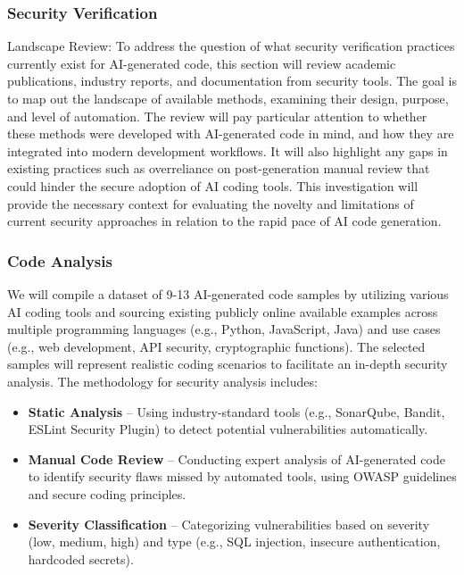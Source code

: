\subsubsection{Security Verification}
Landscape Review: To address the question of what security verification practices currently exist for AI-generated code, this section will review academic publications, industry reports, and documentation from security tools. The goal is to map out the landscape of available methods, examining their design, purpose, and level of automation. The review will pay particular attention to whether these methods were developed with AI-generated code in mind, and how they are integrated into modern development workflows. It will also highlight any gaps in existing practices such as overreliance on post-generation manual review that could hinder the secure adoption of AI coding tools. This investigation will provide the necessary context for evaluating the novelty and limitations of current security approaches in relation to the rapid pace of AI code generation.

\subsubsection{Code Analysis}

We will compile a dataset of 9-13 AI-generated code samples by utilizing various AI coding tools and sourcing existing publicly online available examples across multiple programming languages (e.g., Python, JavaScript, Java) and use cases (e.g., web development, API security, cryptographic functions). The selected samples will represent realistic coding scenarios to facilitate an in-depth security analysis.
The methodology for security analysis includes:

\begin{itemize}
    \item \textbf{Static Analysis} – Using industry-standard tools (e.g., SonarQube, Bandit, ESLint Security Plugin) to detect potential vulnerabilities automatically.
    \item \textbf{Manual Code Review} – Conducting expert analysis of AI-generated code to identify security flaws missed by automated tools, using OWASP guidelines and secure coding principles.
    \item \textbf{Severity Classification} – Categorizing vulnerabilities based on severity (low, medium, high) and type (e.g., SQL injection, insecure authentication, hardcoded secrets).
\end{itemize}

